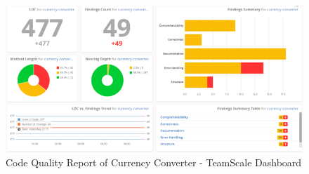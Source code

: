 \documentclass[letterpaper, 11pt]{report}
\begin{document}
\\
\begin{figure}[htb]
\begin{center}
\includegraphics[width=12cm]{D1-Reengineering Opportunity/images/Picture2.png}
\caption{Code Quality Report of Currency Converter - TeamScale Dashboard}
\end{center}
\end{figure}
\pagebreak
{}
\end{document}
